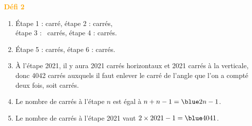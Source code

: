 \hspace*{-7.5mm} \textcolor{orange}{\bf Défi 2} \\
   \begin{enumerate}
      \item Étape 1 : { carré}, étape 2 : { carrés}, \\
         étape 3 : {~carrés}, étape 4 : { carrés}.
      \item Étape 5 : { carrés}, étape 6 : { carrés}.
      \item À l'étape 2021, il y aura 2021 carrés horizontaux et 2021 carrés à la verticale, donc 4042 carrés auxquels il faut enlever le carré de l'angle que l'on a compté deux fois, soit { carrés}.
      \item Le nombre de carrés à l'étape $n$ est égal à $n+n-1 ={\blue 2n-1}$.
      \item Le nombre de carrés à l'étape 2021 vaut $2\times2021-1 ={\blue 4041}$.
   \end{enumerate}

